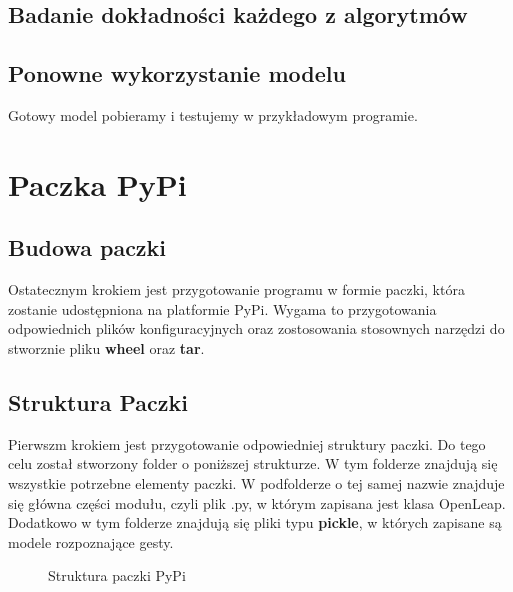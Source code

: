     \subsection{Badanie dokładności każdego z algorytmów}
    
    \subsection{Ponowne wykorzystanie modelu}
    
    \quad Gotowy model pobieramy i testujemy w przykładowym programie. 
    
    \section{Paczka PyPi}

    \subsection{Budowa paczki}
    
    \quad Ostatecznym krokiem jest przygotowanie programu w formie paczki, która zostanie udostępniona na platformie PyPi. Wygama to przygotowania odpowiednich plików konfiguracyjnych oraz zostosowania stosownych narzędzi do stworznie pliku \textbf{wheel} oraz \textbf{tar}. 
    
    \subsection{Struktura Paczki}
    \quad Pierwszm krokiem jest przygotowanie odpowiedniej struktury paczki. Do tego celu został stworzony folder o poniższej strukturze. W tym folderze znajdują się wszystkie potrzebne elementy paczki. W podfolderze o tej samej nazwie znajduje się główna części modułu, czyli plik .py, w którym zapisana jest klasa OpenLeap. Dodatkowo w tym folderze znajdują się pliki typu \textbf{pickle}, w których zapisane są modele rozpoznające gesty.
    
    \begin{figure}
    \centering
        \begin{minipage}{7cm}
        \end{minipage}
        \caption{Struktura paczki PyPi}
    \end{figure}
    
